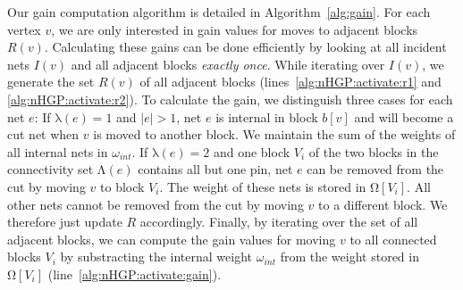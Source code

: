 \documentclass[runningheads,a4paper]{llncs}
\begin{document}
Our gain computation algorithm is detailed in Algorithm~\ref{alg:gain}. For each vertex $v$, we are only interested in gain values for moves to adjacent blocks $R(v)$. Calculating these gains can be done efficiently by looking at all incident nets $I(v)$ and all adjacent blocks \emph{exactly once}. While iterating over $I(v)$, we generate the set $R(v)$ of all adjacent blocks (lines~\ref{alg:nHGP:activate:r1} and \ref{alg:nHGP:activate:r2}). To calculate the gain, we distinguish three cases for each net $e$: If $\mathrm{\lambda}(e)=1$ and $|e| > 1$,
net $e$ is internal in block $b[v]$ and will become a cut net when $v$ is moved to another block. We maintain the sum of the weights of all internal nets in $\omega_{int}$. If $\mathrm{\lambda}(e)=2$ and one block $V_i$ of the two blocks in the connectivity set $\mathrm{\Lambda}(e)$ contains all but one pin, net $e$ can be removed from the cut by moving $v$ to block $V_i$.
The weight of these nets is stored in  $\mathrm{\Omega}[V_i]$. All other nets cannot be
removed from the cut by moving $v$ to a different block. We therefore just update $R$ accordingly.
Finally, by iterating over the set of all adjacent blocks, we can compute the gain values for moving $v$ to all connected blocks $V_i$ by substracting the internal weight $\omega_{int}$ from the weight stored in $\mathrm{\Omega}[V_i]$ (line~\ref{alg:nHGP:activate:gain}).
\end{document}
